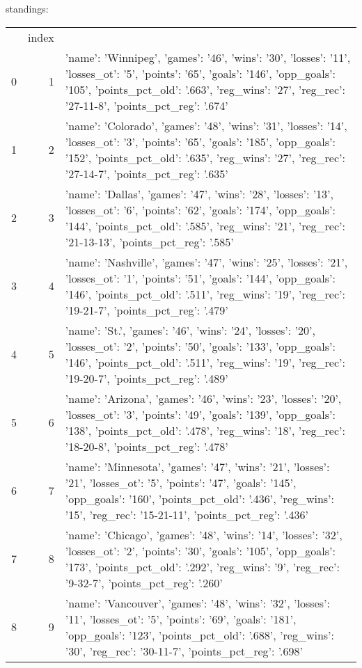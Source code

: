 {} standings:
\begin{tabular}{lrl}
 & index &  \\
0 & 1 & {'name': 'Winnipeg', 'games': '46', 'wins': '30', 'losses': '11', 'losses_ot': '5', 'points': '65', 'goals': '146', 'opp_goals': '105', 'points_pct_old': '.663', 'reg_wins': '27', 'reg_rec': '27-11-8', 'points_pct_reg': '.674'} \\
1 & 2 & {'name': 'Colorado', 'games': '48', 'wins': '31', 'losses': '14', 'losses_ot': '3', 'points': '65', 'goals': '185', 'opp_goals': '152', 'points_pct_old': '.635', 'reg_wins': '27', 'reg_rec': '27-14-7', 'points_pct_reg': '.635'} \\
2 & 3 & {'name': 'Dallas', 'games': '47', 'wins': '28', 'losses': '13', 'losses_ot': '6', 'points': '62', 'goals': '174', 'opp_goals': '144', 'points_pct_old': '.585', 'reg_wins': '21', 'reg_rec': '21-13-13', 'points_pct_reg': '.585'} \\
3 & 4 & {'name': 'Nashville', 'games': '47', 'wins': '25', 'losses': '21', 'losses_ot': '1', 'points': '51', 'goals': '144', 'opp_goals': '146', 'points_pct_old': '.511', 'reg_wins': '19', 'reg_rec': '19-21-7', 'points_pct_reg': '.479'} \\
4 & 5 & {'name': 'St.', 'games': '46', 'wins': '24', 'losses': '20', 'losses_ot': '2', 'points': '50', 'goals': '133', 'opp_goals': '146', 'points_pct_old': '.511', 'reg_wins': '19', 'reg_rec': '19-20-7', 'points_pct_reg': '.489'} \\
5 & 6 & {'name': 'Arizona', 'games': '46', 'wins': '23', 'losses': '20', 'losses_ot': '3', 'points': '49', 'goals': '139', 'opp_goals': '138', 'points_pct_old': '.478', 'reg_wins': '18', 'reg_rec': '18-20-8', 'points_pct_reg': '.478'} \\
6 & 7 & {'name': 'Minnesota', 'games': '47', 'wins': '21', 'losses': '21', 'losses_ot': '5', 'points': '47', 'goals': '145', 'opp_goals': '160', 'points_pct_old': '.436', 'reg_wins': '15', 'reg_rec': '15-21-11', 'points_pct_reg': '.436'} \\
7 & 8 & {'name': 'Chicago', 'games': '48', 'wins': '14', 'losses': '32', 'losses_ot': '2', 'points': '30', 'goals': '105', 'opp_goals': '173', 'points_pct_old': '.292', 'reg_wins': '9', 'reg_rec': '9-32-7', 'points_pct_reg': '.260'} \\
8 & 9 & {'name': 'Vancouver', 'games': '48', 'wins': '32', 'losses': '11', 'losses_ot': '5', 'points': '69', 'goals': '181', 'opp_goals': '123', 'points_pct_old': '.688', 'reg_wins': '30', 'reg_rec': '30-11-7', 'points_pct_reg': '.698'} \\

\end{tabular}
